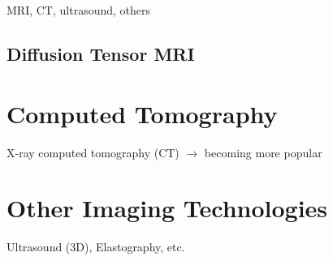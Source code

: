 MRI, CT, ultrasound, others \\

\subsection{Diffusion Tensor MRI}
\label{Diffusion Tensor MRI}

\section{Computed Tomography}
\label{Computed Tomography}
X-ray computed tomography (CT) $\rightarrow$ becoming more popular \\
\section{Other Imaging Technologies}
\label{Other Imaging Technologies}
Ultrasound (3D), Elastography, etc.